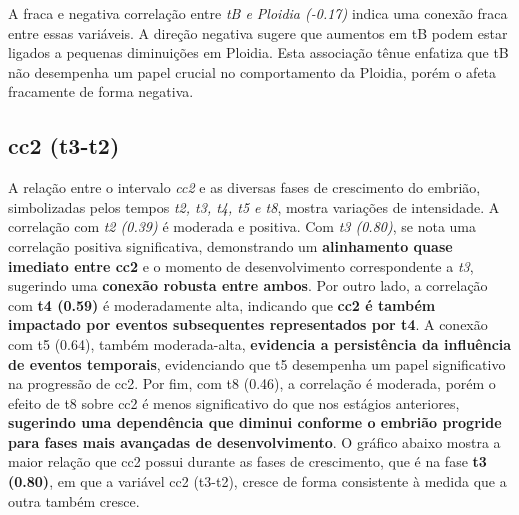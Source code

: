 A fraca e negativa correlação entre \textit{tB e Ploidia (-0.17)} indica uma conexão fraca entre essas variáveis. A direção negativa sugere que aumentos em tB podem estar ligados a pequenas diminuições em Ploidia. Esta associação tênue enfatiza que tB não desempenha um papel crucial no comportamento da Ploidia, porém o afeta fracamente de forma negativa.

\subsection*{cc2 (t3-t2)}
A relação entre o intervalo \textit{cc2} e as diversas fases de crescimento do embrião, simbolizadas pelos tempos \textit{t2, t3, t4, t5 e t8}, mostra variações de intensidade. A correlação com \textit{t2 (0.39)} é moderada e positiva. Com \textit{t3 (0.80)}, se nota uma correlação positiva significativa, demonstrando um \textbf{alinhamento quase imediato entre cc2} e o momento de desenvolvimento correspondente a \textit{t3}, sugerindo uma \textbf{conexão robusta entre ambos}. Por outro lado, a correlação com \textbf{t4 (0.59)} é moderadamente alta, indicando que \textbf{cc2 é também impactado por eventos subsequentes representados por t4}. A conexão com t5 (0.64), também moderada-alta, \textbf{evidencia a persistência da influência de eventos temporais}, evidenciando que t5 desempenha um papel significativo na progressão de cc2. Por fim, com t8 (0.46), a correlação é moderada, porém o efeito de t8 sobre cc2 é menos significativo do que nos estágios anteriores, \textbf{sugerindo uma dependência que diminui conforme o embrião progride para fases mais avançadas de desenvolvimento}. O gráfico abaixo mostra a maior relação que cc2 possui durante as fases de crescimento, que é na fase \textbf{t3 (0.80)}, em que a variável cc2 (t3-t2), cresce de forma consistente à medida que a outra também cresce. 

